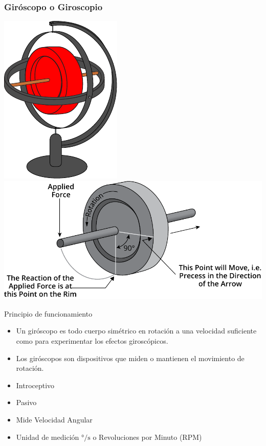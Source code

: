 \begin{frame}
    \frametitle{Giróscopo o Giroscopio}
    \scriptsize
    \begin{center}
        \hspace{1em}
        \includegraphics[width=0.15\columnwidth]{images/gyroscope.pdf}
        \hspace{1em}
        \includegraphics[width=0.4\columnwidth]{images/gyroscope_precession.pdf}
    \end{center}

    \begin{block}{Principio de funcionamiento}
        \begin{itemize}
            \item Un giróscopo es todo cuerpo simétrico en rotación a una velocidad suficiente como para experimentar los efectos giroscópicos.
            \item Los giróscopos son dispositivos que miden o mantienen el movimiento de rotación.
        \end{itemize}

    \end{block}

    \begin{itemize}
        \item Introceptivo
        \item Pasivo
        \item Mide Velocidad Angular
        \item Unidad de medición $\si{\degree\per\second}$ o Revoluciones por Minuto (RPM)
    \end{itemize}


\end{frame}

